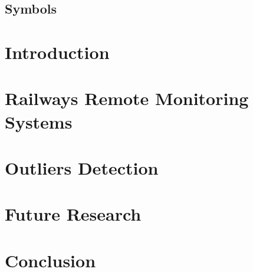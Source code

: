 \documentclass[11pt,a4paper,twoside,openright]{report}
\begin{document}




\begin{Prolog}
\cleardoublepage

\tableofcontents


\printnomenclature

\chapter*{Symbols}


	
\end{Prolog}

\StartBody

\chapter{Introduction}



\chapter{Railways Remote Monitoring Systems}


\chapter{Outliers Detection}









\chapter{Future Research}


\chapter{Conclusion}





%
%


%
%
\end{document}
